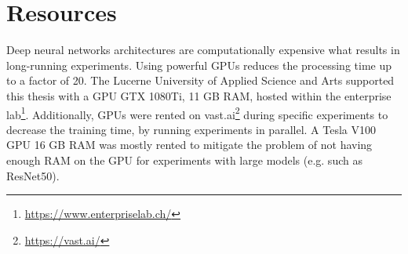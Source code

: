 \section{Resources}
\label{sec:Resources}
Deep neural networks architectures are computationally expensive what results in long-running experiments. Using powerful \glspl{GPU} reduces the processing time up to a factor of 20. The Lucerne University of Applied Science and Arts supported this thesis with a GPU GTX 1080Ti, 11 GB RAM, hosted within the enterprise lab\footnote{\url{https://www.enterpriselab.ch/}}. 
\newline
\newline
Additionally, \glspl{GPU} were rented on vast.ai\footnote{\url{https://vast.ai/}} during specific experiments to decrease the training time, by running experiments in parallel. A Tesla V100 \gls{GPU} 16 GB RAM was mostly rented to mitigate the problem of not having enough RAM on the GPU for experiments with large models (e.g. such as ResNet50).

